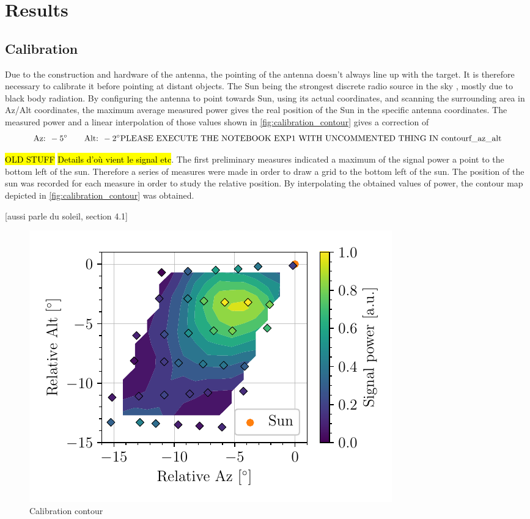 \section{Results}
\subsection{Calibration}
Due to the construction and hardware of the antenna, the pointing of the antenna doesn't always line up with the target. It is therefore necessary to calibrate it before pointing at distant objects. The Sun being the strongest discrete radio source in the sky \cite{burke_introduction_2013}, mostly due to black body radiation.
By configuring the antenna to point towards Sun, using its actual coordinates, and scanning the surrounding area in Az/Alt coordinates, the maximum average measured power gives the real position of the Sun in the specific antenna coordinates. The measured power and a linear interpolation of those values shown in \autoref{fig:calibration_contour} gives a correction of
\begin{equation}
    \textrm{Az: } -5^\circ \qquad \textrm{Alt: } -2^\circ \\
    \textrm{PLEASE EXECUTE THE NOTEBOOK EXP1 WITH UNCOMMENTED THING IN contourf\_az\_alt}
\end{equation}


\hl{OLD STUFF}
\hl{Details d'où vient le signal etc}.
The first preliminary measures indicated a maximum of the signal power a point to the bottom left of the sun.
Therefore a series of measures were made in order to draw a grid to the bottom left of the sun. The position of the sun was recorded for each measure in order to study the relative position.
By interpolating the obtained values of power, the contour map depicted in \autoref{fig:calibration_contour} was obtained.

[aussi \cite{lauterbach_radio_2022} parle du soleil, section 4.1]

\begin{figure}[htbp]
    \centering
    \includegraphics[scale=1]{figures/calibration_contour.pdf}
    \caption{Calibration contour}
    \label{fig:calibration_contour}
\end{figure}

